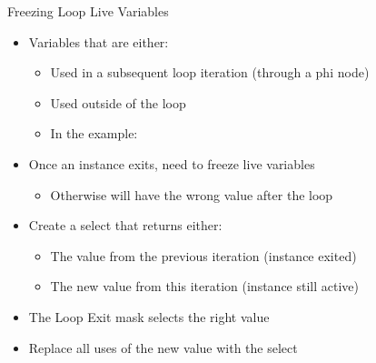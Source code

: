 \begin{frame}{Freezing Loop Live Variables}

\begin{itemize}
    \item Variables that are either:
    \begin{itemize}
        \item Used in a subsequent loop iteration (through a phi node)
        \item Used outside of the loop
        \item In the example: 
    \end{itemize}
    \item Once an instance exits, need to freeze live variables
    \begin{itemize}
        \item Otherwise will have the wrong value after the loop 
    \end{itemize}
    \item Create a select that returns either: 
    \begin{itemize}
        \item The value from the previous iteration (instance exited)
        \item The new value from this iteration (instance still active)
    \end{itemize}
    \item The Loop Exit mask selects the right value
    \item Replace all uses of the new value with the select
\end{itemize}

\end{frame}


